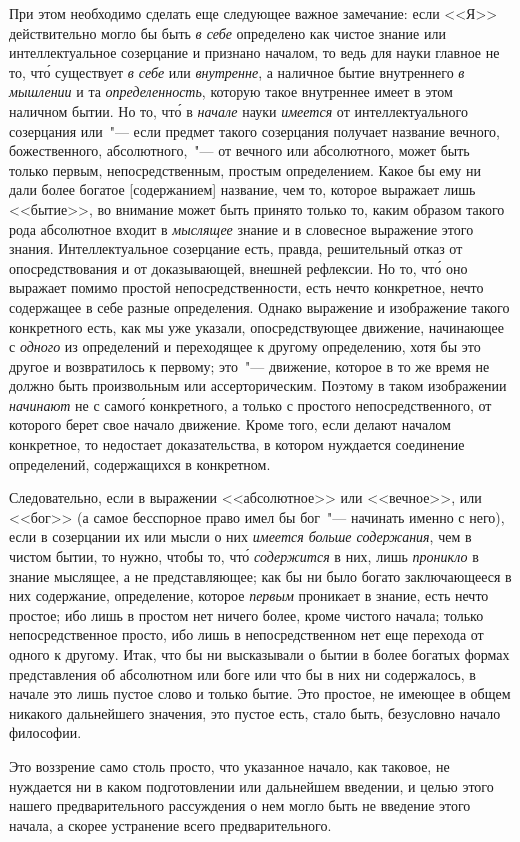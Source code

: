 При этом необходимо сделать еще следующее важное
замечание: если <<Я>> действительно могло бы быть \emph{в себе}
определено как чистое знание или интеллектуальное
созерцание и признано началом, то ведь для науки главное
не то, чт\'о существует \emph{в себе} или \emph{внутренне}, а наличное
бытие внутреннего \emph{в мышлении} и та \emph{определенность},
которую такое внутреннее имеет в этом наличном бытии.
Но то, чт\'о в \emph{начале} науки \emph{имеется} от интеллектуального
созерцания или~"--- если предмет такого созерцания получает
название вечного, божественного, абсолютного,~"--- от
вечного или абсолютного, может быть только первым, непосредственным,
простым определением. Какое бы ему
ни дали более богатое [содержанием] название, чем то,
которое выражает лишь <<бытие>>, во внимание может
быть принято только то, каким образом такого рода абсолютное
входит в \emph{мыслящее} знание и в словесное выражение
этого знания. Интеллектуальное созерцание есть,
правда, решительный отказ от опосредствования и от доказывающей,
внешней рефлексии. Но то, чт\'о оно выражает
помимо простой непосредственности, есть нечто
конкретное, нечто содержащее в себе разные определения.
Однако выражение и изображение такого конкретного
есть, как мы уже указали, опосредствующее движение,
начинающее с \emph{одного} из определений и переходящее
к другому определению, хотя бы это другое и возвратилось
к первому; это~"--- движение, которое в то же время
не должно быть произвольным или ассерторическим.
Поэтому в таком изображении \emph{начинают} не с самог\'о
конкретного, а только с простого непосредственного, от
которого берет свое начало движение. Кроме того, если
делают началом конкретное, то недостает доказательства,
в котором нуждается соединение определений, содержащихся
в конкретном.

Следовательно, если в выражении <<абсолютное>> или
<<вечное>>, или <<бог>> (а самое бесспорное право имел бы
бог~"--- начинать именно с него), если в созерцании их или
мысли о них \emph{имеется больше содержания}, чем в чистом
бытии, то нужно, чтобы то, чт\'о \emph{содержится} в них, лишь
\emph{проникло} в знание мыслящее, а не представляющее; как
бы ни было богато заключающееся в них содержание,
определение, которое \emph{первым} проникает в знание, есть
нечто простое; ибо лишь в простом нет ничего более,
кроме чистого начала; только непосредственное просто,
ибо лишь в непосредственном нет еще перехода от одного
к другому. Итак, что бы ни высказывали о бытии в более
богатых формах представления об абсолютном или боге
или что бы в них ни содержалось, в начале это лишь
пустое слово и только бытие. Это простое, не имеющее
в общем никакого дальнейшего значения, это пустое
есть, стало быть, безусловно начало философии.

Это воззрение само столь просто, что указанное начало,
как таковое, не нуждается ни в каком подготовлении
или дальнейшем введении, и целью этого нашего
предварительного рассуждения о нем могло быть не введение
этого начала, а скорее устранение всего предварительного.


